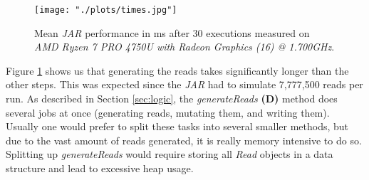 \documentclass[12pt]{article}
\begin{document}

\begin{figure}[htpb]
    \centering
    \texttt{[image: "./plots/times.jpg"]}
    \caption{Mean \textit{JAR} performance in ms after 30 executions measured on \textit{AMD Ryzen 7 PRO 4750U with Radeon Graphics (16) @ 1.700GHz}.}
    \label{fig:plots-times-jpg}
\end{figure}

Figure \ref{fig:plots-times-jpg} shows us that generating the reads takes significantly longer than the other steps. This was expected since
the \textit{JAR} had to simulate 7,777,500 reads per run. As described in Section \ref{sec:logic}, the \textit{generateReads} \textbf{(D)} method
does several jobs at once (generating reads, mutating them, and writing them). Usually one would prefer to split these tasks into several 
smaller methods, but due to the vast amount of reads generated, it is really memory intensive to do so. Splitting up
\textit{generateReads} would require storing all \textit{Read} objects in a data structure and lead to excessive heap usage.

\end{document}

